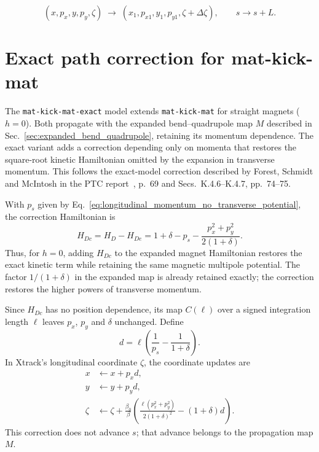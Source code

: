 \begin{equation}
(x,p_x,y,p_y,\zeta)
\;\longrightarrow\;
(x_1,p_{x1},y_1,p_{y1},\zeta+\Delta\zeta),
\qquad
s \rightarrow s+L .
\end{equation}


\section{Exact path correction for mat-kick-mat}
\label{sec:mat_kick_mat_exact}

The \texttt{mat-kick-mat-exact} model extends \texttt{mat-kick-mat} for
straight magnets ($h=0$). Both propagate with the expanded bend--quadrupole
map $M$ described in Sec.~\ref{sec:expanded_bend_quadrupole}, retaining its
momentum dependence. The exact variant adds a correction depending only on momenta
that restores the square-root kinetic Hamiltonian omitted by the expansion
in transverse momentum. This follows the exact-model correction described by
Forest, Schmidt and McIntosh in the PTC report~\cite{ptc2002}, p.~69 and
Secs.~K.4.6--K.4.7, pp.~74--75.

With $p_s$ given by
Eq.~\eqref{eq:longitudinal_momentum_no_transverse_potential}, the correction Hamiltonian is
\begin{equation}
  H_{Dc}=H_D-H_{De}
        =1+\delta-p_s-\frac{p_x^2+p_y^2}{2(1+\delta)}.
  \label{eq:mat_kick_mat_exact_correction}
\end{equation}
Thus, for $h=0$, adding $H_{Dc}$ to the expanded magnet Hamiltonian restores
the exact kinetic term while retaining the same magnetic multipole potential.
The factor $1/(1+\delta)$ in the expanded map is already retained exactly;
the correction restores the higher powers of transverse momentum.

Since $H_{Dc}$ has no position dependence, its map $C(\ell)$ over a signed
integration length $\ell$ leaves $p_x$, $p_y$ and $\delta$ unchanged. Define
\begin{equation}
  d=\ell\left(\frac{1}{p_s}-\frac{1}{1+\delta}\right).
\end{equation}
In Xtrack's longitudinal coordinate $\zeta$, the coordinate updates are
\begin{align}
  x &\leftarrow x+p_x d, \\
  y &\leftarrow y+p_y d, \\
  \zeta &\leftarrow \zeta+
    \frac{\beta_0}{\beta}\left(
       \frac{\ell(p_x^2+p_y^2)}{2(1+\delta)^2}-(1+\delta)d\right).
\end{align}
This correction does not advance $s$; that advance belongs to the propagation
map $M$.


